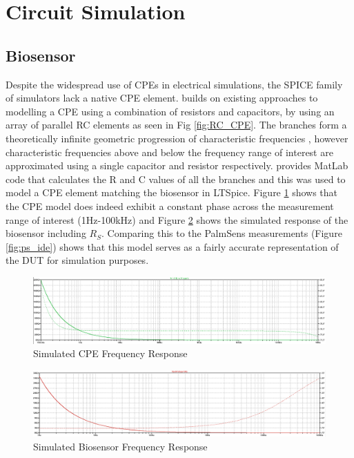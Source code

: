 \section{Circuit Simulation}

\subsection{Biosensor}
Despite the widespread use of \acp{CPE} in electrical simulations, the SPICE family of simulators lack a native CPE element.  \cite{wilsonSimulatingFractionalCapacitors2023} builds on existing approaches to modelling a CPE using a combination of resistors and capacitors, by using an array of parallel RC elements as seen in Fig \ref{fig:RC_CPE}. The branches form a theoretically infinite geometric progression of characteristic frequencies \cite{wilsonSimulatingFractionalCapacitors2023}, however characteristic frequencies above and below the frequency range of interest are approximated using a single capacitor and resistor respectively. \cite{wilsonSimulatingFractionalCapacitors2023} provides MatLab code that calculates the R and C values of all the branches and this was used to model a CPE element matching the biosensor in LTSpice. Figure \ref{fig:cpe_sim} shows that the CPE model does indeed exhibit a constant phase across the measurement range of interest (1Hz-100kHz) and Figure \ref{fig:biosensor_sim} shows the simulated response of the biosensor including $R_S$. Comparing this to the PalmSens measurements (Figure \ref{fig:ps_ide}) shows that this model serves as a fairly accurate representation of the \ac{DUT} for simulation purposes.

\begin{figure}[H]
        \centering
        \includegraphics[width=\textwidth]{CPE_linear.png}
        \caption{Simulated CPE Frequency Response}
        \label{fig:cpe_sim}
\end{figure}
\begin{figure}[H]
        \centering
        \includegraphics[width=\textwidth]{DUT_Z.png}
        \caption{Simulated Biosensor Frequency Response}
        \label{fig:biosensor_sim}
\end{figure}

